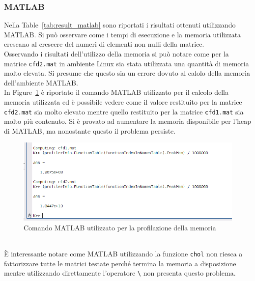 \documentclass[a4paper, 12pt]{article}
\begin{document}
            \subsubsection{MATLAB}
                Nella Table~\ref{tab:result_matlab} sono riportati i risultati ottenuti utilizzando MATLAB.
                Si può osservare come i tempi di esecuzione e la memoria utilizzata crescano al crescere del numeri di
                elementi non nulli della matrice.\\
                Osservando i risultati dell'utilizzo della memoria si può notare come per la matrice \texttt{cfd2.mat}
                in ambiente Linux sia stata utilizzata una quantità di memoria molto elevata. Si presume che questo
                sia un errore dovuto al calolo della memoria dell'ambiente MATLAB.\\
                In Figure~\ref{fig:matlab_overflow} è riportato il comando MATLAB utilizzato per il calcolo della 
                memoria utilizzata ed è possibile vedere come il valore restituito per la matrice \texttt{cfd2.mat} sia
                molto elevato mentre quello restituito per la matrice \texttt{cfd1.mat} sia molto più contenuto. 
                Si è provato ad aumentare la memoria disponibile per l'heap di MATLAB, ma nonostante questo il problema 
                persiste.
                \begin{figure}[h]
                    \includegraphics[width=\textwidth]{matlab_overflow}
                    \caption{Comando MATLAB utilizzato per la profilazione della memoria}
                    \label{fig:matlab_overflow}
                \end{figure}\\
                \`E interessante notare come MATLAB utilizzando la funzione \texttt{chol} non riesca a fattorizzare
                tutte le matrici testate perché termina la memoria a disposizione mentre utilizzando direttamente
                l'operatore \verb$\$ non presenta questo problema.\\
\end{document}
